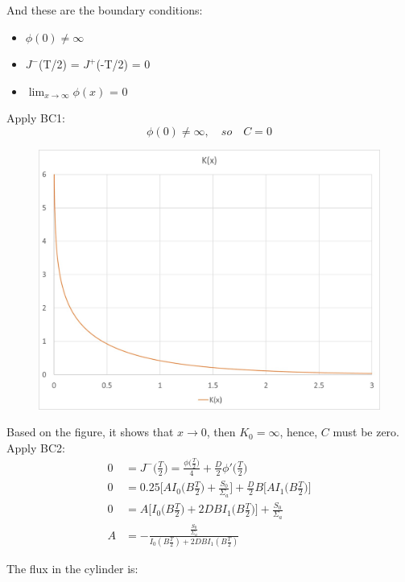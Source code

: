 \documentclass{amsart}
\theoremstyle{definition}
\begin{document}
And these are the boundary conditions:
\begin{itemize}
    \item $\phi(0) \neq \infty$
    \item $J^-$(T/2) = $J^+$(-T/2) = 0
    \item $\lim_{x\to\infty} \phi(x)$ = 0
\end{itemize}


Apply BC1:
\begin{equation*}
    \phi(0) \neq \infty, \quad so \quad C = 0
\end{equation*}

\begin{figure}[h!]
    \includegraphics[width=.8\linewidth]{K_bessel}
\end{figure}


Based on the figure, it shows that $x\rightarrow 0$, then $K_0 = \infty$, hence, $C$ must be zero.
\bigbreak
Apply BC2:
\begin{align*}
    0 &= J^-\bigg(\frac{T}{2}\bigg) = \frac{\phi\bigg(\frac{T}{2}\bigg)}{4}+\frac{D}{2}\phi'\bigg(\frac{T}{2}\bigg) \\
    0 &= 0.25\bigg[AI_0\bigg(B\frac{T}{2}\bigg)+\frac{S_0}{\Sigma_a}\bigg]+\frac{D}{2}B\bigg[AI_1\bigg(B\frac{T}{2}\bigg)\bigg] \\
    0 &= A\bigg[I_0\bigg(B\frac{T}{2}\bigg)+2DBI_1\bigg(B\frac{T}{2}\bigg)\bigg]+\frac{S_0}{\Sigma_a} \\
    A &= -\frac{\frac{S_0}{\Sigma_a}}{I_0(B\frac{T}{2})+2DBI_1(B\frac{T}{2})}
\end{align*}


The flux in the cylinder is:
\end{document}
